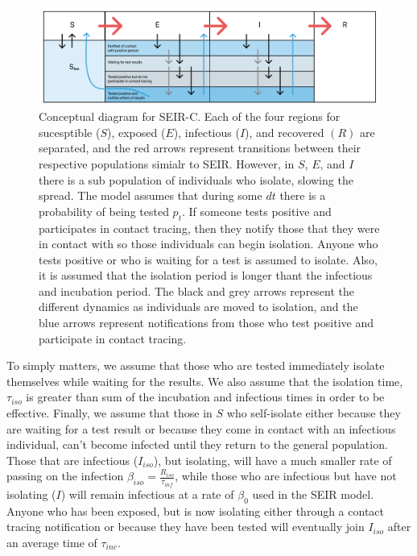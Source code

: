 \documentclass[notitlepage, superscriptaddress]{revtex4-2}
\begin{document}
\begin{figure}
\centering
\includegraphics[width=6in]{SEIR-C_diagram.png}
\caption{\label{f:SEIR-C}
 Conceptual diagram for SEIR-C. Each of the four regions for sucesptible ($S$), exposed ($E$), infectious ($I$), and recovered $(R)$ are separated, and the red arrows represent transitions between their respective populations simialr to SEIR. However, in $S$, $E$, and $I$ there is a sub population of individuals who isolate, slowing the spread. The model assumes that during some $dt$ there is a probability of being tested $p_t$. If someone tests positive and participates in contact tracing, then they notify those that they were in contact with so those individuals can begin isolation. Anyone who tests positive or who is waiting for a test is assumed to isolate. Also, it is assumed that the isolation period is longer thant the infectious and incubation period. The black and grey arrows represent the different dynamics as individuals are moved to isolation, and the blue arrows represent notifications from those who test positive and participate in contact tracing.}
\end{figure}

To simply matters, we assume that those who are tested immediately isolate themselves while waiting for the results. We also assume that the isolation time, $\tau_{iso}$ is greater than sum of the incubation and infectious times in order to be effective. Finally, we assume that those in $S$ who self-isolate either because they are waiting for a test result or because they come in contact with an infectious individual, can't become infected until they return to the general population. Those that are infectious ($I_{iso}$), but isolating, will have a much smaller rate of passing on the infection $\beta_{iso} = \frac{R_{iso}}{\tau_{inf}}$, while those who are infectious but have not isolating ($I$) will remain infectious at a rate of $\beta_{0}$ used in the SEIR model. Anyone who has been exposed, but is now isolating either through a contact tracing notification or because they have been tested will eventually join $I_{iso}$ after an average time of $\tau_{inc}$. 
\end{document}
